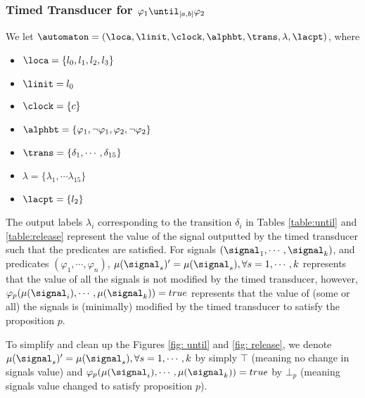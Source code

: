 \subsubsection{Timed Transducer for $\varphi_1\until_{[a,b]}\varphi_2$}       
        We let $\automaton=(\loca,\linit,\clock,\allowbreak\alphbt,\trans, \lambda, \lacpt)$, where
        \begin{itemize}
            \item $\loca=\{l_0, l_1, l_2, l_3\}$ %
            
            \item $\linit=l_0$ 
            
            \item $\clock=\{c\}$
            
            \item $\allowbreak\alphbt= \{\varphi_1, \neg \varphi_1, \varphi_2, \neg \varphi_2\}$
            
            \item %
            $\trans=\{ \delta_1, \cdots ,\delta_{15} \}$
            

            
            \item %
            $\lambda=\{\lambda_1,\cdots \lambda_{15}\}$
            \item $\lacpt=\{l_2\}$
        \end{itemize}
\begin{remark}
    The output labels $\lambda_i$ corresponding to the transition $\delta_i$ in Tables \ref{table:until} and \ref{table:release} represent the value of the signal outputted by the timed transducer such that the predicates are satisfied. For signals $(\signal_1, \cdots, \signal_k)$, and predicates $(\varphi_1, \cdots, \varphi_n)$, $\mu(\signal_s)'=\mu(\signal_s), \forall s= 1, \cdots, k$ represents that the value of all the signals is not modified by the timed transducer, however, $\varphi_p(\mu(\signal_i), \cdots, \mu(\signal_k))=true$ represents that the value of (some or all) the signals is (minimally) modified by the timed transducer to satisfy the proposition $p$.

    To simplify and clean up the Figures \ref{fig: until} and \ref{fig: release}, we denote $\mu(\signal_s)'=\mu(\signal_s), \forall s= 1, \cdots, k$ by simply $\top$ (meaning no change in signals value) and $\varphi_p(\mu(\signal_i), \cdots, \mu(\signal_k))=true$ by $\bot_p$ (meaning signals value changed to satisfy proposition $p$).
    
\end{remark}
    
